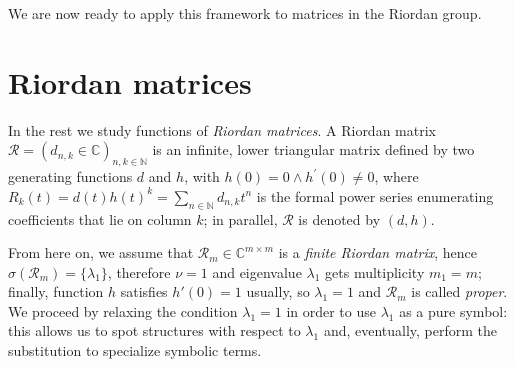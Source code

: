 We are now ready to apply this framework to matrices in the Riordan group.

\section*{Riordan matrices}

In the rest we study functions of \emph{Riordan matrices}. A Riordan matrix
$\mathcal{R}=(d_{n,k}\in\mathbb{C})_{n,k\in\mathbb{N}}$ is an infinite, lower
triangular matrix defined by two generating functions $d$ and $h$, with $h(0)=0
\wedge h^{\prime}(0)\neq0$, where $R_{k}(t) = d(t)h(t)^{k} =
\sum_{n\in\mathbb{N}}{d_{n,k}t^{n}}$ is the formal power series enumerating
coefficients that lie on column $k$; in parallel, $\mathcal{R}$ is denoted by $(d,
h)$. 

From here on, we assume that $\mathcal{R}_{m}\in\mathbb{C}^{m\times m}$ is a
\emph{finite Riordan matrix}, hence $\sigma(\mathcal{R}_{m})= \lbrace
\lambda_{1} \rbrace$, therefore $\nu=1$ and eigenvalue $\lambda_{1}$ gets
multiplicity $m_{1}=m$; finally, function $h$ satisfies $h'(0)=1$ usually, so
$\lambda_{1}=1$ and $\mathcal{R}_{m}$ is called \textit{proper}.
We proceed by relaxing the condition $\lambda_{1}=1$ in order to use
$\lambda_{1}$ as a pure symbol: this allows us to spot structures with respect
to $\lambda_{1}$ and, eventually, perform the substitution to specialize
symbolic terms.


